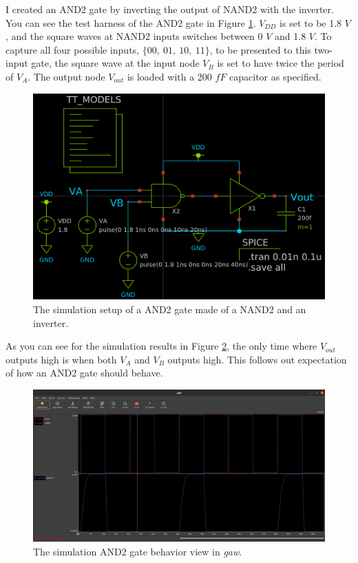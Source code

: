 \documentclass[11pt]{article}
\begin{document}
    \FloatBarrier
    I created an AND2 gate by inverting the output of NAND2 with the inverter. You can see the test harness of the AND2 gate in Figure \ref{fig:and2}. $V_{DD}$ is set to be 1.8 $V$, and the square waves at NAND2 inputs switches between 0 $V$ and 1.8 $V$. To capture all four possible inputs, $\{00,\ 01,\ 10,\ 11\}$, to be presented to this two-input gate, the square wave at the input node $V_B$ is set to have twice the period of $V_A$. The output node $V_{out}$ is loaded with a 200 $fF$ capacitor as specified.
    \begin{figure}[!ht]
        \includegraphics[width=\linewidth]{AND2_harness.png}
        \caption{The simulation setup of a AND2 gate made of a NAND2 and an inverter.}
        \label{fig:and2}
    \end{figure}

    As you can see for the simulation results in Figure \ref{fig:and2res}, the only time where $V_{out}$ outputs high is when both $V_A$ and $V_B$ outputs high. This follows out expectation of how an AND2 gate should behave.
	\begin{figure}[!ht]
        \includegraphics[width=\linewidth]{AND2_sim.png}
        \caption{The simulation AND2 gate behavior view in \textit{gaw}.}
        \label{fig:and2res}
    \end{figure}
\end{document}
